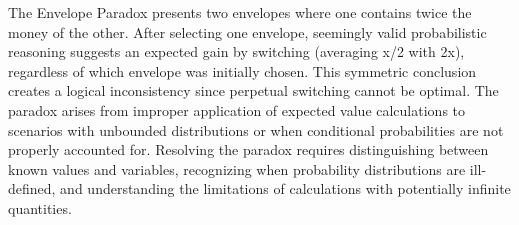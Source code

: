 The Envelope Paradox presents two envelopes where one contains twice the money of the other. After selecting one envelope, seemingly valid probabilistic reasoning suggests an expected gain by switching (averaging x/2 with 2x), regardless of which envelope was initially chosen. This symmetric conclusion creates a logical inconsistency since perpetual switching cannot be optimal. The paradox arises from improper application of expected value calculations to scenarios with unbounded distributions or when conditional probabilities are not properly accounted for. Resolving the paradox requires distinguishing between known values and variables, recognizing when probability distributions are ill-defined, and understanding the limitations of calculations with potentially infinite quantities.
